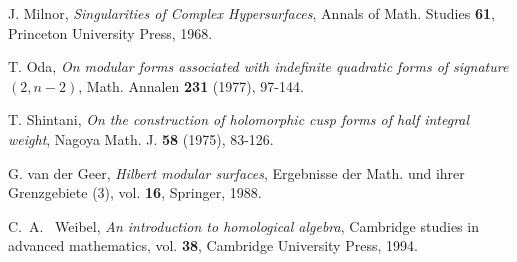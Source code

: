 \documentclass[12pt,leqno]{amsart}
\numberwithin{equation}{section}
\theoremstyle{plain}
\theoremstyle{definition}
\theoremstyle{remark}
\begin{document}
\begin{thebibliography}{99}
J. Milnor,
\emph{Singularities of Complex Hypersurfaces},
Annals of Math. Studies {\bf 61}, Princeton University Press, 1968.



T. Oda,
\emph{On modular forms associated with indefinite quadratic forms of signature $(2,n-2)$},
Math. Annalen \textbf{231} (1977), 97-144.


T. Shintani, \emph{On the construction of
holomorphic cusp forms of half integral weight}, Nagoya Math. J.
\textbf{58} (1975), 83-126.





G. van der Geer, \emph{Hilbert modular surfaces}, Ergebnisse der
Math. und ihrer Grenzgebiete (3), vol. \textbf{16}, Springer, 1988.


C.\ A. \  Weibel, \emph{An introduction to homological algebra}, Cambridge studies in advanced mathematics, vol. 
\textbf{38}, Cambridge University Press, 1994.





\end{thebibliography}
\end{document}
